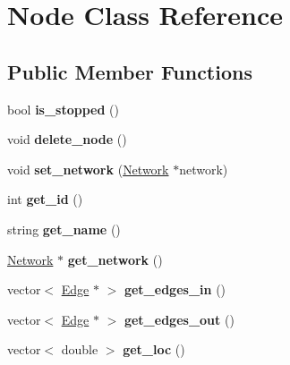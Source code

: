 \hypertarget{classNode}{}\section{Node Class Reference}
\label{classNode}
\subsection*{Public Member Functions}
\begin{DoxyCompactItemize}
\item 
\hypertarget{classNode_a84588c0426ecba3f272158e901a147f4}{}bool {\bfseries is\+\_\+stopped} ()\label{classNode_a84588c0426ecba3f272158e901a147f4}

\item 
\hypertarget{classNode_a91f1b8c208c71d40b99ee747422ded86}{}void {\bfseries delete\+\_\+node} ()\label{classNode_a91f1b8c208c71d40b99ee747422ded86}

\item 
\hypertarget{classNode_afb8137c4ef9bfb7f3bb5285897d766af}{}void {\bfseries set\+\_\+network} (\hyperlink{classNetwork}{Network} $\ast$network)\label{classNode_afb8137c4ef9bfb7f3bb5285897d766af}

\item 
\hypertarget{classNode_a0be494ea471ea887e4becbeb32def3e9}{}int {\bfseries get\+\_\+id} ()\label{classNode_a0be494ea471ea887e4becbeb32def3e9}

\item 
\hypertarget{classNode_a81e9f5e01dea4e47abf7a911b5bc5296}{}string {\bfseries get\+\_\+name} ()\label{classNode_a81e9f5e01dea4e47abf7a911b5bc5296}

\item 
\hypertarget{classNode_aa820f9bda2d2780f2249e1ead61cbc8c}{}\hyperlink{classNetwork}{Network} $\ast$ {\bfseries get\+\_\+network} ()\label{classNode_aa820f9bda2d2780f2249e1ead61cbc8c}

\item 
\hypertarget{classNode_ae5c6daf380dc280cf620d941e3d68f7b}{}vector$<$ \hyperlink{classEdge}{Edge} $\ast$ $>$ {\bfseries get\+\_\+edges\+\_\+in} ()\label{classNode_ae5c6daf380dc280cf620d941e3d68f7b}

\item 
\hypertarget{classNode_a2ea047846eeca09af1b6ce4b33794f31}{}vector$<$ \hyperlink{classEdge}{Edge} $\ast$ $>$ {\bfseries get\+\_\+edges\+\_\+out} ()\label{classNode_a2ea047846eeca09af1b6ce4b33794f31}

\item 
\hypertarget{classNode_a3897d13b879221d499c6c2ec9b38b0f6}{}vector$<$ double $>$ {\bfseries get\+\_\+loc} ()\label{classNode_a3897d13b879221d499c6c2ec9b38b0f6}


\end{DoxyCompactItemize}
